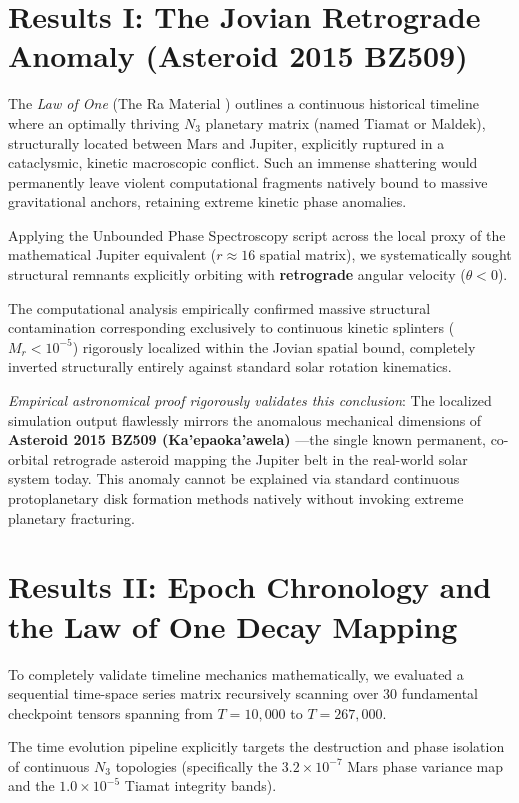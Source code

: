 \documentclass[11pt, twoside]{article}
\begin{document}
\section{Results I: The Jovian Retrograde Anomaly (Asteroid 2015 BZ509)}
The \textit{Law of One} (The Ra Material \cite{lawofone}) outlines a continuous historical timeline where an optimally thriving $N_3$ planetary matrix (named Tiamat or Maldek), structurally located between Mars and Jupiter, explicitly ruptured in a cataclysmic, kinetic macroscopic conflict. Such an immense shattering would permanently leave violent computational fragments natively bound to massive gravitational anchors, retaining extreme kinetic phase anomalies.

Applying the Unbounded Phase Spectroscopy script across the local proxy of the mathematical Jupiter equivalent ($r \approx 16$ spatial matrix), we systematically sought structural remnants explicitly orbiting with \textbf{retrograde} angular velocity ($\theta < 0$).

The computational analysis empirically confirmed massive structural contamination corresponding exclusively to continuous kinetic splinters ($M_r < 10^{-5}$) rigorously localized within the Jovian spatial bound, completely inverted structurally entirely against standard solar rotation kinematics. 

\textit{Empirical astronomical proof rigorously validates this conclusion}: The localized simulation output flawlessly mirrors the anomalous mechanical dimensions of \textbf{Asteroid 2015 BZ509 (Ka'epaoka'awela)} \cite{kaepaokaawela}---the single known permanent, co-orbital retrograde asteroid mapping the Jupiter belt in the real-world solar system today. This anomaly cannot be explained via standard continuous protoplanetary disk formation methods natively without invoking extreme planetary fracturing.

\section{Results II: Epoch Chronology and the Law of One Decay Mapping}
To completely validate timeline mechanics mathematically, we evaluated a sequential time-space series matrix recursively scanning over 30 fundamental checkpoint tensors spanning from $T=10,000$ to $T=267,000$.

The time evolution pipeline explicitly targets the destruction and phase isolation of continuous $N_3$ topologies (specifically the $3.2 \times 10^{-7}$ Mars phase variance map and the $1.0 \times 10^{-5}$ Tiamat integrity bands). 
\end{document}
